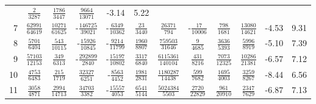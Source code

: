 \begin{sidewaystable}
\begin{tabular}{r|ccccccccc|c@{ -- }c@{\%}}
&  $\frac{               2}{            3287}$
&  $\frac{            1786}{            3447}$
&  $\frac{            9664}{           13071}$
&  -3.14 &  5.22
\\
7
&  $\frac{           62991}{           64619}$
&  $\frac{           10271}{           61625}$
& -$\frac{          146725}{           39021}$
& -$\frac{            6349}{           10362}$
&  $\frac{              23}{            3440}$
&  $\frac{           26371}{             794}$
& -$\frac{              17}{           10006}$
&  $\frac{             798}{            1681}$
&  $\frac{           13080}{           14621}$
&  -4.53 &  9.31
\\
8
&  $\frac{            5701}{            6404}$
&  $\frac{             543}{           10115}$
& -$\frac{           15926}{           10845}$
& -$\frac{            9214}{           11799}$
&  $\frac{            1960}{            8807}$
&  $\frac{          759503}{           31646}$
&  $\frac{               9}{            4685}$
&  $\frac{            3636}{            5393}$
&  $\frac{            5996}{            8919}$
&  -5.10 &  7.39
\\
9
&  $\frac{           57103}{           12153}$
&  $\frac{             349}{            6313}$
& -$\frac{          292899}{            2840}$
& -$\frac{           15197}{           10802}$
&  $\frac{            3317}{            6840}$
&  $\frac{         6115361}{          140104}$
&  $\frac{             431}{            8216}$
&  $\frac{            7073}{           12325}$
&  $\frac{           10286}{           21381}$
&  -6.57 &  7.12
\\
10
&  $\frac{            4753}{            6483}$
&  $\frac{             215}{            1719}$
&  $\frac{           32327}{            6251}$
& -$\frac{            8563}{            4452}$
&  $\frac{            1981}{            2831}$
&  $\frac{         1180287}{           14438}$
&  $\frac{             599}{            7682}$
&  $\frac{            1695}{            4003}$
&  $\frac{            3259}{            8267}$
&  -8.44 &  6.56
\\
11
&  $\frac{            3058}{            4871}$
&  $\frac{            2994}{           14713}$
&  $\frac{           34703}{            3382}$
& -$\frac{           15557}{            4053}$
&  $\frac{            6541}{            5144}$
&  $\frac{         5024384}{            5503}$
&  $\frac{            2720}{           22829}$
&  $\frac{             961}{           20910}$
&  $\frac{            2347}{            7629}$
&  -6.87 &  7.13
\\

\end{tabular}
\end{sidewaystable}
